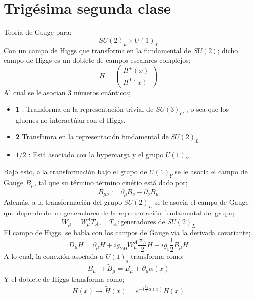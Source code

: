 \documentclass[../main.tex]{subfiles}
\begin{document}
\section{Trigésima segunda clase}
Teoría de Gauge para;
\begin{equation}
  SU(2)_L\times U(1)_Y
 \end{equation}
 Con un campo de Higgs que transforma en la fundamental de $SU(2)$; dicho campo de Higgs es un doblete de campos escalares complejos;
 \begin{equation}
   H = \begin{pmatrix}
     H^+(x) \\ H^0(x)
   \end{pmatrix}
  \end{equation}
  Al cual se le asocian 3 números cuánticos;
  \begin{itemize}
    \item \textbf{1} : Transforma en la representación trivial de $SU(3)_C$ , o sea que los gluones no interactúan con el Higgs.
    \item \textbf{2} Transfomra en la representación fundamental de $SU(2)_L$.
    \item $1/2$ : Está asociado con la hypercarga y el grupo $U(1)_Y$
  \end{itemize}
  Bajo esto, a la transformación bajo el grupo de $U(1)_Y$ se le asocia el campo de Gauge $B_\mu$, tal que su término término cinétio está dado por;
  \begin{equation}
    B_{\mu\nu} := \partial_\mu B_\nu - \partial_\nu B_\mu
   \end{equation}
   Además, a la transformación del grupo $SU(2)_L$ se le asocia el campo de Gauge que depende de los generadores de la representación fundamental del grupo;
   \begin{equation}
     W_\mu = W^A_\mu T_A, \quad T_A: \text{generadores de }SU(2)_L
    \end{equation}
El campo de Higgs, se habla con los campos de Gauge via la derivada covariante;
\begin{equation}
  D_\mu H = \partial_\mu H + ig_{YM} W^A_\mu \frac{\sigma_A}{2} H + ig_{y}\frac{1}{2}B_\mu H
 \end{equation}
 A lo cual, la conexión asociada a $U(1)_y$ transforma como;
 \begin{equation}
   B_\mu \rightarrow \tilde{B}_\mu=B_\mu + \partial_\mu \alpha(x)
  \end{equation}
  Y el doblete de Higgs transforma como;
  \begin{equation}
    H(x)\rightarrow \tilde{H}(x) = e^{-i\frac{g_y}{2}\alpha(x)} H(x)
   \end{equation}
\end{document}
